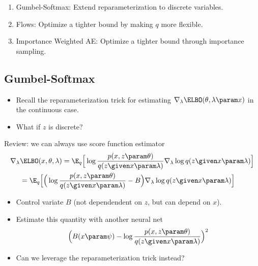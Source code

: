 

\begin{frame}
\begin{enumerate}
\item Gumbel-Softmax: Extend reparameterization to discrete variables.
\item Flows: Optimize a tighter bound by making $q$ more flexible.
\item Importance Weighted AE:  Optimize a tighter bound through importance sampling.
\end{enumerate}
\end{frame}

\subsection{Gumbel-Softmax}
\begin{frame}
\begin{itemize}
    \item Recall the reparameterization trick for estimating $\nabla_\lambda \ELBO(\theta, \lambda \param x)$ in the continuous case.
    \item What if $z$ is discrete?
\end{itemize}
\end{frame}

\begin{frame}
Review: we can always use score function estimator 
\begin{align*}
 \nabla_\lambda &\ELBO(x, \theta, \lambda) = \E_{q}\Big[\log \frac{p(x, z \param \theta)}{q(z \given x \param \lambda)}\nabla_{\lambda}\log q(z \given x \param \lambda)\Big]     \\
 &= \E_{q}\Big[\Big(\log \frac{p(x, z \param \theta)}{q(z \given x \param \lambda)}- B\Big)\nabla_{\lambda}\log q(z \given x \param \lambda)\Big] 
\end{align*}

\begin{itemize}
    \item Control variate $B$ (not dependendent on $z$, but can depend on $x$). 
    \item Estimate this quantity with another neural net \citep{Mnih2014}
    \[ \Big( B(x \param \psi) -\log \frac{p(x, z \param \theta)}{q(z \given x \param \lambda)} \Big)^2 \]
    \item Can we leverage the reparameterization trick instead?
\end{itemize}
\end{frame}

